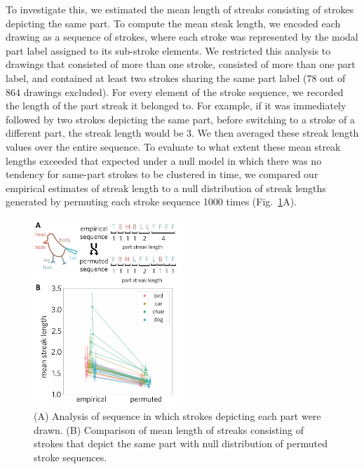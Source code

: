 \documentclass[10pt,letterpaper]{article}
\begin{document}
To investigate this, we estimated the mean length of streaks consisting of strokes depicting the same part.
To compute the mean steak length, we encoded each drawing as a sequence of strokes, where each stroke was represented by the modal part label assigned to its sub-stroke elements. 
We restricted this analysis to drawings that consisted of more than one stroke, consisted of more than one part label, and contained at least two strokes sharing the same part label (78 out of 864 drawings excluded). 
For every element of the stroke sequence, we recorded the length of the part streak it belonged to. 
For example, if it was immediately followed by two strokes depicting the same part, before switching to a stroke of a different part, the streak length would be 3. 
We then averaged these streak length values over the entire sequence. 
To evaluate to what extent these mean streak lengths exceeded that expected under a null model in which there was no tendency for same-part strokes to be clustered in time, we compared our empirical estimates of streak length to a null distribution of streak lengths generated by permuting each stroke sequence 1000 times (Fig.~\ref{stroke_sequence_fig}A). 

\begin{figure}[t]
\centering
\includegraphics[width=0.5\textwidth]{figures/6_part_sequence.pdf}
\caption{(A) Analysis of sequence in which strokes depicting each part were drawn. (B) Comparison of mean length of streaks consisting of strokes that depict the same part with null distribution of permuted stroke sequences.}
\label{stroke_sequence_fig}
\end{figure}
\end{document}
